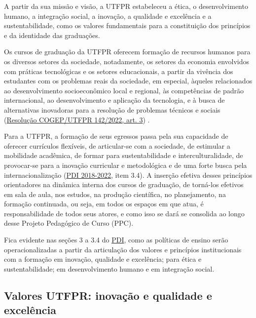 A partir da sua missão e visão, a UTFPR estabeleceu a ética, o desenvolvimento humano, a integração social, a inovação, a qualidade e excelência e a sustentabilidade, como os valores fundamentais para a constituição dos princípios e da identidade das graduações.

Os cursos de graduação da UTFPR oferecem formação de recursos humanos para os diversos setores da sociedade, notadamente, os setores da economia envolvidos com práticas tecnológicas e os setores educacionais, a partir da vivência dos estudantes com os problemas reais da sociedade, em especial, àqueles relacionados ao desenvolvimento socioeconômico local e regional, às competências de padrão internacional, ao desenvolvimento e aplicação da tecnologia, e à busca de alternativas inovadoras para a resolução de problemas técnicos e sociais (\href{https://sei.utfpr.edu.br/sei/publicacoes/controlador_publicacoes.php?acao=publicacao_visualizar&id_documento=2803898&id_orgao_publicacao=0}{Resolução COGEP/UTFPR 142/2022, art. 3\textordmasculine}) \nocite{cogep142}.

Para a UTFPR, a formação de seus egressos passa pela sua capacidade de oferecer currículos flexíveis, de articular-se com a sociedade, de estimular a mobilidade acadêmica, de formar para sustentabilidade e interculturalidade, de provocar-se para a inovação curricular e metodológica e de uma forte busca pela internacionalização (\href{https://cloud.utfpr.edu.br/index.php/s/15P0OcMLMdt9Rv7}{PDI 2018-2022}, item 3.4\nocite{pdiutfpr}). A inserção efetiva desses princípios orientadores na dinâmica interna dos cursos de graduação, de torná-los efetivos em sala de aula, nos estudos, na produção científica, no planejamento, na formação continuada, ou seja, em todos os espaços em que atua, é responsabilidade de todos seus atores, e como isso se dará se consolida ao longo desse Projeto Pedagógico de Curso (PPC).


Fica evidente nas seções 3 a 3.4 do \href{https://cloud.utfpr.edu.br/index.php/s/15P0OcMLMdt9Rv7}{PDI}, como as políticas de ensino serão operacionalizadas a partir da articulação dos valores e princípios institucionais com a formação em inovação, qualidade e excelência; para ética e sustentabilidade; em desenvolvimento humano e em integração social.

\subsection{Valores UTFPR: inovação e qualidade e excelência}
\label{subsec:valores}

